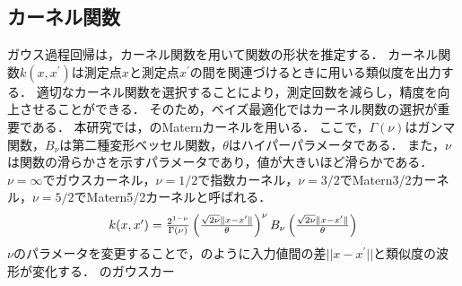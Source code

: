 \documentclass[twocolumn]{ltjarticle}
\begin{document}
\subsection{カーネル関数}

ガウス過程回帰は，カーネル関数を用いて関数の形状を推定する．
カーネル関数\(k(x, x^{\prime})\)は測定点\(x\)と測定点\(x^{\prime}\)の間を関連づけるときに用いる類似度を出力する．
適切なカーネル関数を選択することにより，測定回数を減らし，精度を向上させることができる．
そのため，ベイズ最適化ではカーネル関数の選択が重要である\cite{gaussian_process}．
本研究では，のMaternカーネルを用いる．
ここで，\(\Gamma (\nu)\)はガンマ関数，\(B_{\nu}\)は第二種変形ベッセル関数，\(\theta\)はハイパーパラメータである．
また，\(\nu\)は関数の滑らかさを示すパラメータであり，値が大きいほど滑らかである．
\(\nu=\infty\)でガウスカーネル，\(\nu=1/2\)で指数カーネル，\(\nu=3/2\)でMatern3/2カーネル，\(\nu=5/2\)でMatern5/2カーネルと呼ばれる．
\begin{align}
	\scalebox{1.0}{
		\(
		k(x, x^{\prime}) = \frac{2^{1-\nu}}{\Gamma (\nu)}\left(\frac{\sqrt{2\nu}\Vert x - x^{\prime} \Vert}{\theta}\right)^{\nu} B_{\nu} \left(\frac{\sqrt{2 \nu} \Vert x - x^{\prime} \Vert}{\theta}\right) \label{eq:matern}
		\)
	}
\end{align}
\(\nu\)のパラメータを変更することで，のように入力値間の差\(||x-x^{\prime}||\)と類似度の波形が変化する．
のガウスカー
\setlength\intextsep{6pt}
\setlength\textfloatsep{6pt}
\end{document}
